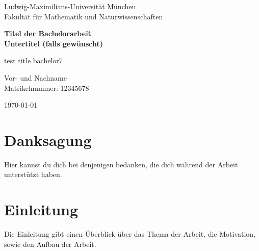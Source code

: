 \documentclass[12pt]{report}
\begin{document}
\begin{titlepage}
    \centering
    \vspace*{1.5cm}
    
    {\Large Ludwig-Maximilians-Universität München\\[0.3cm]
    Fakultät für Mathematik und Naturwissenschaften}
    
    \vspace{1.5cm}
    
    {\huge\bfseries Titel der Bachelorarbeit\\[0.4cm]
    \Large Untertitel (falls gewünscht)}
    
    \vspace{2cm}
    
    {\Large test title bachelor7}
    
    \vspace{2cm}
    
    {\Large Vor- und Nachname\\[0.2cm]
    Matrikelnummer: 12345678}
    
    \vfill
    
    {\Large \today}
    
\end{titlepage}






\begin{abstract}
    Hier folgt eine kurze Zusammenfassung der Arbeit. Erläutere in wenigen Sätzen das Thema, die Methodik und die wichtigsten Ergebnisse.
\end{abstract}
\thispagestyle{empty}
\newpage

\section*{Danksagung}
Hier kannst du dich bei denjenigen bedanken, die dich während der Arbeit unterstützt haben. 
\thispagestyle{empty}
\newpage

\tableofcontents
\thispagestyle{empty}
\newpage

\listoffigures
\thispagestyle{empty}
\newpage

\listoftables
\thispagestyle{empty}
\newpage

\section{Einleitung}
Die Einleitung gibt einen Überblick über das Thema der Arbeit, die Motivation, sowie den Aufbau der Arbeit.
\end{document}
